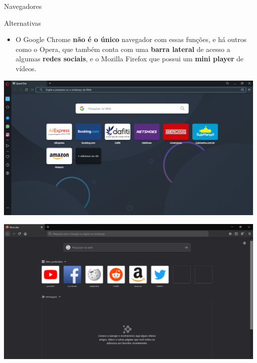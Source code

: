 \begin{frame}{Navegadores}
	\begin{block}{Alternativas}
		\begin{itemize}
			\item O Google Chrome \textbf{não é o único} navegador com essas funções, e há outros como o Opera, que também conta com uma \textbf{barra lateral} de acesso a algumas \textbf{redes sociais}, e o Mozilla Firefox que possui um \textbf{mini player} de vídeos.
		\end{itemize}
	\end{block}
	
	\bigskip
	
	\begin{minipage}{0.49\linewidth}
		\centering
		\includegraphics[width=1\linewidth]{Figuras/Ch03/fig8.4}
	\end{minipage}\hfill
	\begin{minipage}{0.49\linewidth}
		\centering
		\includegraphics[width=1\linewidth]{Figuras/Ch03/fig8.5}
	\end{minipage}
\end{frame}


